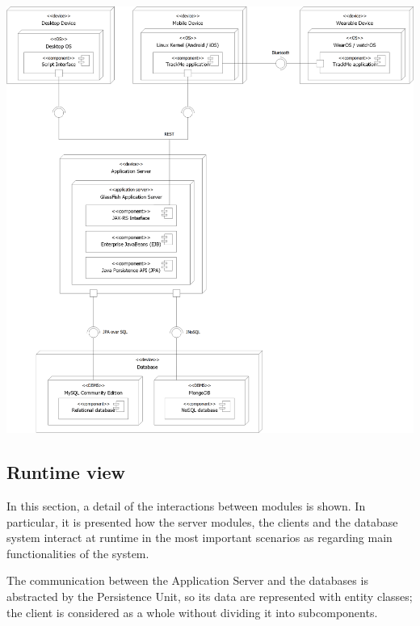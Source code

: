 \begin{center}
\includegraphics[scale=0.5]{sections/diagrams/deployment.png}
\newline
{}
\end{center}

\clearpage

\subsection{Runtime view}
In this section, a detail of the interactions between modules is shown. In particular, it is presented how the server modules, the clients and the database system interact at runtime in the most important scenarios as regarding main functionalities of the system.

The communication between the Application Server and the databases is abstracted by the Persistence Unit, so its data are represented with entity classes; the client is considered as a whole without dividing it into subcomponents.

